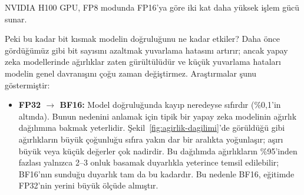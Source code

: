 NVIDIA H100 GPU, FP8 modunda FP16'ya göre iki kat daha yüksek işlem gücü sunar.

Peki bu kadar bit kısmak modelin doğruluğunu ne kadar etkiler? Daha önce gördüğümüz gibi bit sayısını azaltmak yuvarlama hatasını artırır; ancak yapay zeka modellerinde ağırlıklar zaten gürültülüdür ve küçük yuvarlama hataları modelin genel davranışını çoğu zaman değiştirmez. Araştırmalar şunu göstermiştir:

\begin{itemize}
\item \textbf{FP32 $\rightarrow$ BF16:} Model doğruluğunda kayıp neredeyse sıfırdır (\%0{,}1'in altında). Bunun nedenini anlamak için tipik bir yapay zeka modelinin ağırlık dağılımına bakmak yeterlidir. Şekil~\ref{fig:agirlik-dagilimi}'de görüldüğü gibi ağırlıkların büyük çoğunluğu sıfıra yakın dar bir aralıkta yoğunlaşır; aşırı büyük veya küçük değerler çok nadirdir. Bu dağılımda ağırlıkların \%95'inden fazlası yalnızca 2--3 onluk basamak duyarlıkla yeterince temsil edilebilir; BF16'nın sunduğu duyarlık tam da bu kadardır. Bu nedenle BF16, eğitimde FP32'nin yerini büyük ölçüde almıştır.

\begin{figure}[htbp]
\centering
{}
\end{figure}
\end{itemize}
